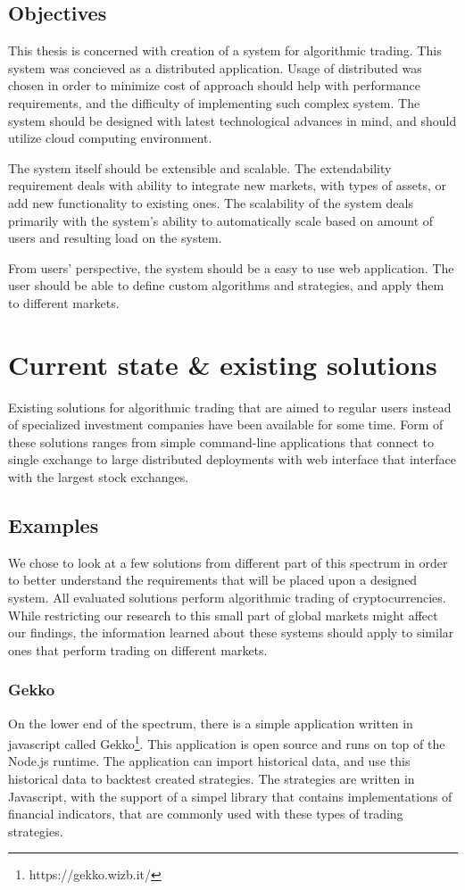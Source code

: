 \section{Objectives}
This thesis is concerned with creation of a system for algorithmic trading. This system was concieved
as a distributed application. Usage of distributed was chosen in order to minimize cost of
approach should help with performance requirements,
and the difficulty of implementing such complex system. The system should be designed with latest technological advances in mind, and
should utilize cloud computing environment.

The system itself should be extensible and scalable. The extendability requirement deals with ability to integrate new markets,
with types of assets, or add new functionality to existing ones. The scalability of the system deals primarily with the system's
ability to automatically scale based on amount of users and resulting load on the system.

From users' perspective, the system should be a easy to use web application. The user should be able to define custom
algorithms and strategies, and apply them to different markets.

\chapter{Current state \& existing solutions}
\label{chapter:current_state}
Existing solutions for algorithmic trading that are aimed to regular users instead of specialized investment companies
have been available for some time. Form of these solutions ranges from simple command-line applications that connect to single exchange
to large distributed deployments with web interface that interface with the largest stock exchanges\cite{Agopyan_financialbusiness}.

\section{Examples}
We chose to look at a few solutions from different part of this spectrum in order to better understand the requirements
that will be placed upon a designed system. All evaluated solutions perform algorithmic trading of cryptocurrencies.
While restricting our research to this small part of global markets might affect our findings, the information learned about
these systems should apply to similar ones that perform trading on different markets.

\subsection{Gekko}
On the lower end of the spectrum, there is a simple application written in javascript called Gekko\footnote{https://gekko.wizb.it/}.
This application is open source and runs on top of the Node.js runtime. The application can import historical data,
and use this historical data to backtest created strategies. The strategies are written in Javascript, with the support
of a simpel library that contains implementations of financial indicators, that are commonly used with these types
of trading strategies.

